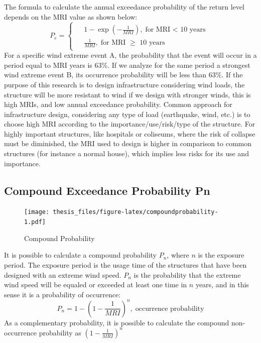 \documentclass[12pt,oneside]{reedthesis}
\begin{document}
The formula to calculate the annual exceedance probability of the return level depends on the MRI value as shown below:
\begin{equation}
        P_e = 
        \begin{cases}
          \begin{aligned}
                &1-\exp\left(-\frac{1}{MRI}\right),\;\textrm{for MRI < 10 years}
                \\
                &\frac{1}{MRI},\;\textrm{for MRI }\geq\textrm{ 10 years}      
          \end{aligned}
        \end{cases}
  \label{eq:pe}
\end{equation}
For a specific wind extreme event A, the probability that the event will occur in a period equal to MRI years is 63\%. If we analyze for the same period a strongest wind extreme event B, its occurrence probability will be less than 63\%. If the purpose of this research is to design infrastructure considering wind loads, the structure will be more resistant to wind if we design with stronger winds, this is high MRIs, and low annual exceedance probability. Common approach for infrastructure design, considering any type of load (earthquake, wind, etc.) is to choose high MRI according to the importance/use/risk/type of the structure. For highly important structures, like hospitals or coliseums, where the risk of collapse must be diminished, the MRI used to design is higher in comparison to common structures (for instance a normal house), which implies less risks for its use and importance.

\hypertarget{compound-exceedance-probability-pn}{%
\subsection{Compound Exceedance Probability Pn}\label{compound-exceedance-probability-pn}}

\footnotesize
\begin{figure}
\centering
\texttt{[image: thesis\_files/figure-latex/compoundprobability-1.pdf]}
\caption{\label{fig:compoundprobability}Compound Probability}
\end{figure}
\normalsize

It is possible to calculate a compound probability \(P_n\), where \(n\) is the exposure period. The exposure period is the usage time of the structures that have been designed with an extreme wind speed. \(P_n\) is the probability that the extreme wind speed will be equaled or exceeded at least one time in \(n\) years, and in this sense it is a probability of occurrence:
\begin{equation}
        P_n = 1-\left(1-\frac{1}{MRI}\right)^n,\;\textrm{occurrence probability}
  \label{eq:pn}
\end{equation}
As a complementary probability, it is possible to calculate the compound non-occurrence probability as \(\left(1-\frac{1}{MRI}\right)^n\)
\end{document}
